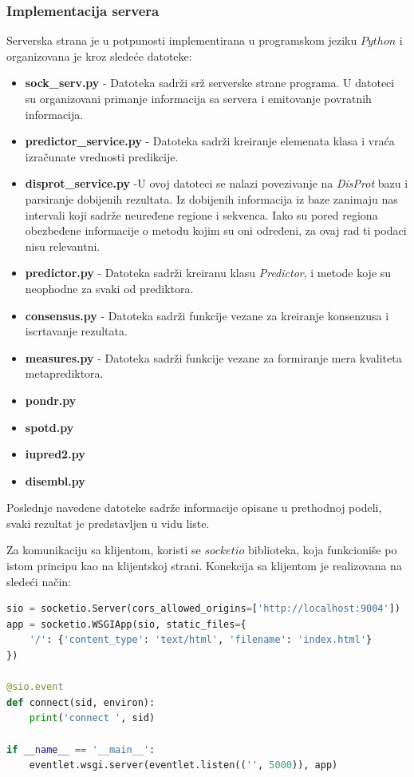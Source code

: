 \subsubsection{Implementacija servera}
Serverska strana je u potpunosti implementirana u programskom jeziku $Python$ i organizovana je kroz sledeće datoteke:
\begin{itemize}
\item \textbf{sock\_serv.py} - Datoteka sadrži srž serverske strane programa. U datoteci su organizovani primanje informacija sa servera i emitovanje povratnih informacija. 
\item \textbf{predictor\_service.py} - Datoteka sadrži kreiranje elemenata klasa i vraća izračunate vrednosti predikcije.  
\item \textbf{disprot\_service.py} -U ovoj datoteci se nalazi povezivanje na   \textit{DisProt} bazu i parsiranje dobijenih rezultata. Iz dobijenih informacija iz baze zanimaju nas intervali koji sadrže neuređene regione i sekvenca. Iako su pored regiona obezbeđene informacije o metodu kojim su oni određeni, za ovaj rad ti podaci nisu relevantni. 
\item \textbf{predictor.py} - Datoteka sadrži kreiranu klasu \textit{Predictor}, i metode koje su neophodne za svaki od prediktora.  
\item \textbf{consensus.py} - Datoteka sadrži funkcije vezane za kreiranje konsenzusa i iscrtavanje rezultata.
\item \textbf{measures.py} - Datoteka sadrži funkcije vezane za formiranje mera kvaliteta metaprediktora. 
\item \textbf{pondr.py}  
\item  \textbf{spotd.py}  
\item \textbf{iupred2.py}  
\item \textbf{disembl.py}  
\end{itemize}
Poslednje navedene datoteke sadrže informacije opisane u prethodnoj podeli, svaki rezultat je predstavljen u vidu liste. 

Za komunikaciju sa klijentom, koristi se $socketio$ biblioteka, koja funkcioniše po istom principu kao na klijentskoj strani. Konekcija sa klijentom je realizovana na sledeći način:

\begin{lstlisting}[language=Python]
sio = socketio.Server(cors_allowed_origins=['http://localhost:9004'])
app = socketio.WSGIApp(sio, static_files={
    '/': {'content_type': 'text/html', 'filename': 'index.html'}
})

@sio.event
def connect(sid, environ):
    print('connect ', sid)
    
if __name__ == '__main__':
    eventlet.wsgi.server(eventlet.listen(('', 5000)), app)
\end{lstlisting}

